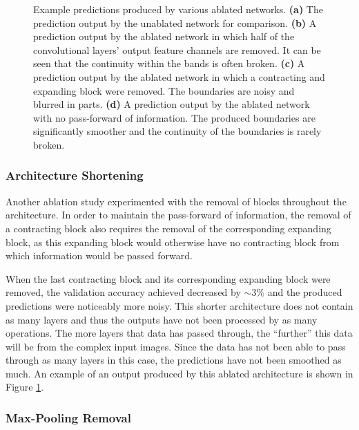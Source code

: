 \begin{figure}[!t]
\begin{subfigure}[t]{0.24\textwidth}
        \caption{}
    \end{subfigure}
    \caption{Example predictions produced by various ablated networks. \textbf{(a)} The prediction output by the unablated network for comparison. \textbf{(b)} A prediction output by the ablated network in which half of the convolutional layers' output feature channels are removed. It can be seen that the continuity within the bands is often broken. \textbf{(c)} A prediction output by the ablated network in which a contracting and expanding block were removed. The boundaries are noisy and blurred in parts. \textbf{(d)} A prediction output by the ablated network with no pass-forward of information. The produced boundaries are significantly smoother and the continuity of the boundaries is rarely broken.}
    \label{fig:ablation}
\end{figure}

\subsubsection{Architecture Shortening}

Another ablation study experimented with the removal of blocks throughout the architecture. In order to maintain the pass-forward of information, the removal of a contracting block also requires the removal of the corresponding expanding block, as this expanding block would otherwise have no contracting block from which information would be passed forward.

When the last contracting block and its corresponding expanding block were removed, the validation accuracy achieved decreased by ${\sim}3\%$ and the produced predictions were noticeably more noisy. This shorter architecture does not contain as many layers and thus the outputs have not been processed by as many operations. The more layers that data has passed through, the ``further'' this data will be from the complex input images. Since the data has not been able to pass through as many layers in this case, the predictions have not been smoothed as much. An example of an output produced by this ablated architecture is shown in Figure \ref{fig:ablation}.

\subsubsection{Max-Pooling Removal}

